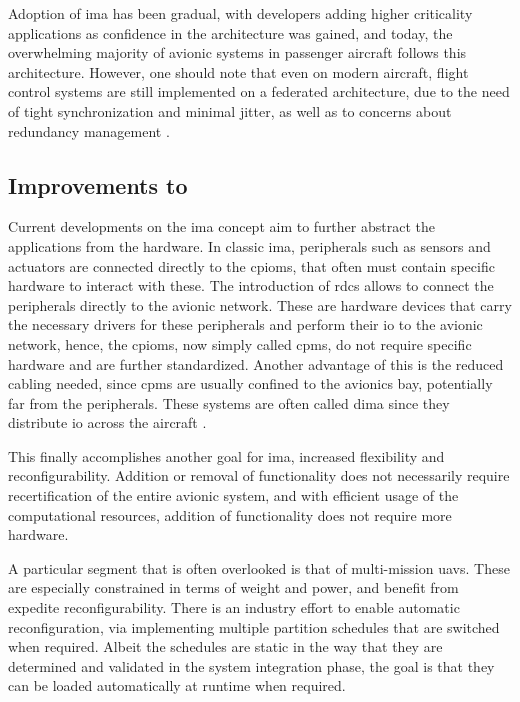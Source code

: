 \documentclass[main.tex]{subfiles}
\begin{document}
Adoption of \gls{ima} has been gradual, with developers adding higher criticality applications as confidence in the architecture was gained, and today, the overwhelming majority of avionic systems in passenger aircraft follows this architecture.
However, one should note that even on modern aircraft, flight control systems are still implemented on a federated architecture, due to the need of tight synchronization and minimal jitter, as well as to concerns about redundancy management \cite{gaska2015integrated}.

\subsection{Improvements to }
\label{sec:future-ima}

Current developments on the \gls{ima} concept aim to further abstract the applications from the hardware.
In classic \gls{ima}, peripherals such as sensors and actuators are connected directly to the \glspl{cpiom}, that often must contain specific hardware to interact with these.
The introduction of \glspl{rdc} allows to connect the peripherals directly to the avionic network.
These are hardware devices that carry the necessary drivers for these peripherals and perform their \gls{io} to the avionic network, hence, the \glspl{cpiom}, now simply called \glspl{cpm}, do not require specific hardware and are further standardized.
Another advantage of this is the reduced cabling needed, since \glspl{cpm} are usually confined to the avionics bay, potentially far from the peripherals.
These systems are often called \gls{dima} since they distribute \gls{io} across the aircraft \cite{barros}.

This finally accomplishes another goal for \gls{ima}, increased flexibility and reconfigurability.
Addition or removal of functionality does not necessarily require recertification of the entire avionic system, and with efficient usage of the computational resources, addition of functionality does not require more hardware.

A particular segment that is often overlooked is that of multi-mission \glspl{uav}.
These are especially constrained in terms of weight and power, and benefit from expedite reconfigurability.
There is an industry effort to enable automatic reconfiguration, via implementing multiple partition schedules that are switched when required.
Albeit the schedules are static in the way that they are determined and validated in the system integration phase, the goal is that they can be loaded automatically at runtime when required.
\end{document}
